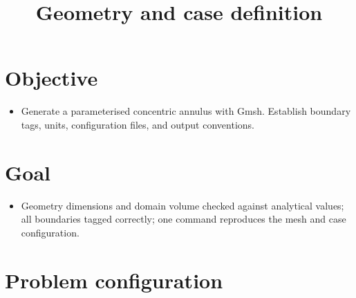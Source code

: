 \documentclass[preprint,3p,number]{elsarticle}
\begin{document}
\title{Geometry and case definition}
\maketitle

\section{Objective}

\begin{itemize}
    \item Generate a parameterised concentric annulus with Gmsh. Establish
    boundary tags, units, configuration files, and output conventions.
\end{itemize}

\section{Goal}

\begin{itemize}
    \item Geometry dimensions and domain volume checked against analytical
    values; all boundaries tagged correctly; one command reproduces the mesh and
    case configuration.
\end{itemize}

\section{Problem configuration}
\end{document}
